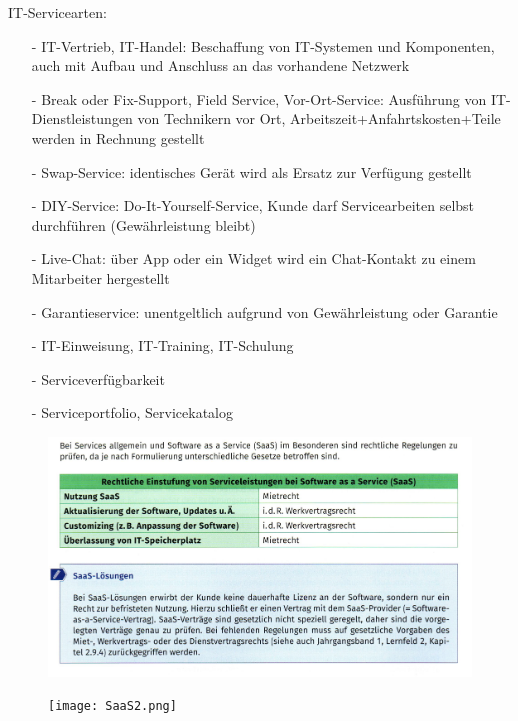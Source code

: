 \documentclass[10pt]{article}
\begin{document}
IT-Servicearten:
\begin{itemize}
\item[-]IT-Vertrieb, IT-Handel: Beschaffung von IT-Systemen und Komponenten, auch mit Aufbau und Anschluss an das vorhandene Netzwerk
\item[-]Break oder Fix-Support, Field Service, Vor-Ort-Service: Ausführung von IT-Dienstleistungen von Technikern vor Ort, Arbeitszeit+Anfahrtskosten+Teile werden in Rechnung gestellt
\item[-]Swap-Service: identisches Gerät wird als Ersatz zur Verfügung gestellt
\item[-]DIY-Service: Do-It-Yourself-Service, Kunde darf Servicearbeiten selbst durchführen (Gewährleistung bleibt)
\item[-]Live-Chat: über App oder ein Widget wird ein Chat-Kontakt zu einem Mitarbeiter hergestellt
\item[-]Garantieservice: unentgeltlich aufgrund von Gewährleistung oder Garantie
\item[-]IT-Einweisung, IT-Training, IT-Schulung
\item[-]Serviceverfügbarkeit
\item[-]Serviceportfolio, Servicekatalog
\end{itemize}


\begin{figure}[H]
\begin{center}
  \includegraphics[width=12cm]{SaaS1.png}
  \end{center}
  \label{fig:saas1.png}
\end{figure}

\begin{figure}[H]
\begin{center}
  \texttt{[image: SaaS2.png]}
  \end{center}
  \label{fig:saas2.png}
\end{figure}
\end{document}
